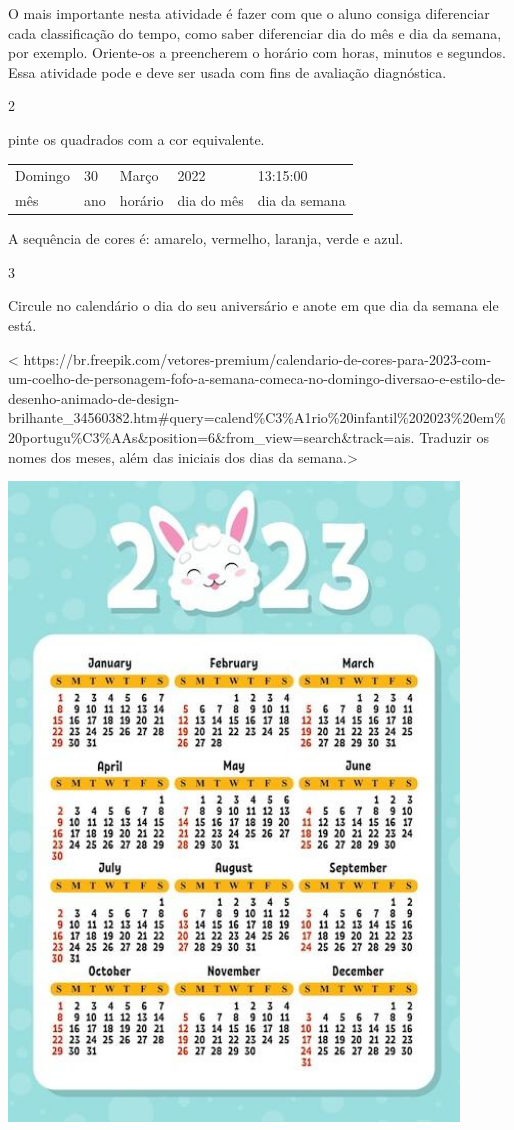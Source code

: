 O mais importante nesta atividade é fazer com que o aluno
consiga diferenciar cada classificação do tempo, como saber diferenciar dia
do mês e dia da semana, por exemplo. Oriente-os a preencherem o horário
com horas, minutos e segundos. Essa atividade pode e deve ser usada com
fins de avaliação diagnóstica.

\num{2}

pinte os quadrados com a cor equivalente.

\begin{longtable}[]{@{}lllll@{}}
\toprule
Domingo & 30 & Março & 2022 & 13:15:00\tabularnewline
mês & ano & horário & dia do mês & dia da semana\tabularnewline
\bottomrule
\end{longtable}

A sequência de cores é: amarelo, vermelho, laranja, verde e azul.

\num{3}

Circule no calendário o dia do seu aniversário e anote em que dia da semana ele está.

\textless{}
https://br.freepik.com/vetores-premium/calendario-de-cores-para-2023-com-um-coelho-de-personagem-fofo-a-semana-comeca-no-domingo-diversao-e-estilo-de-desenho-animado-de-design-brilhante\_34560382.htm\#query=calend\%C3\%A1rio\%20infantil\%202023\%20em\%20portugu\%C3\%AAs\&position=6\&from\_view=search\&track=ais.
Traduzir os nomes dos meses, além das iniciais dos dias da
semana.\textgreater{}

\includegraphics[width=4.71050in,height=6.67143in]{media/image35.jpg}


